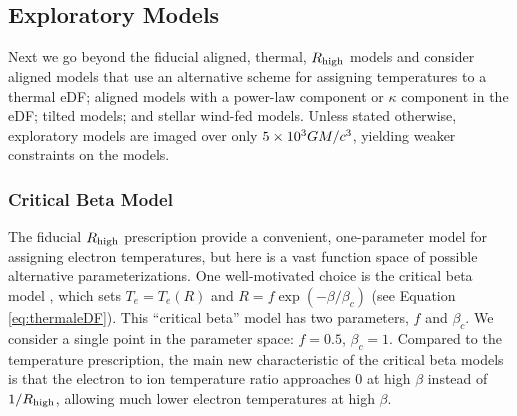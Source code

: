 


\subsection{Exploratory Models}\label{sec:explore}

Next we go beyond the fiducial aligned, thermal, $R_\mathrm{high}$ models and consider aligned models that use an alternative scheme for assigning temperatures to a thermal eDF; aligned models with a power-law component or $\kappa$ component in the eDF; tilted models; and stellar wind-fed models.  Unless stated otherwise, exploratory models are imaged over only $5 \times 10^3 GM/c^3$, yielding weaker constraints on the models.

\subsubsection{Critical Beta Model}

The fiducial $R_\mathrm{high}$ prescription provide a convenient, one-parameter model for assigning electron temperatures, but here is a vast function space of possible alternative parameterizations. One well-motivated choice is the critical beta model \citep{2020MNRAS.493.1404A}, which sets $T_e = T_e(R)$ and $R = f \exp(-\beta/\beta_c)$ (see Equation \ref{eq:thermaleDF}).  This ``critical beta'' model has two parameters, $f$ and $\beta_c$.  We consider a single point in the parameter space: $f = 0.5$, $\beta_c = 1$.  Compared to the \Rh temperature prescription, the main new characteristic of the critical beta models is that the electron to ion temperature ratio approaches 0 at high $\beta$ instead of $1/R_\mathrm{high}$, allowing much lower electron temperatures at high $\beta$.

